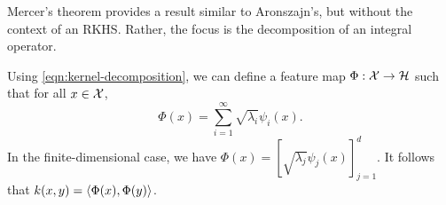\def\dd{\;\mathrm{d}}
\def\dx{\dd{x}}
\def\dy{\dd{y}}
\def\dt{\dd{t}}
Mercer's theorem provides a result similar to Aronszajn's, but without the context of an RKHS.
Rather, the focus is the decomposition of an integral operator.

\begin{theorem}
    \label{thm:mercers}
    \cite{mercer1909xvi}
    
\end{theorem}


    
Using \cref{eqn:kernel-decomposition}, we can define a feature map \(\Phi : \mathcal{X} \to \mathcal{H}\) such that for all \(x \in \mathcal{X}\),
\begin{equation}
    \label{eqn:mercers-feature-map}
    \Phi(x) = \sum_{i=1}^{\infty} \sqrt{\lambda_i} \psi_i(x).
\end{equation}
In the finite-dimensional case, we have \(\Phi(x) = \left[\sqrt{\lambda_j} \psi_j(x)\right]_{j=1}^d\).
It follows that \(k(x,y) = \left\langle \Phi(x), \Phi(y) \right\rangle\).
